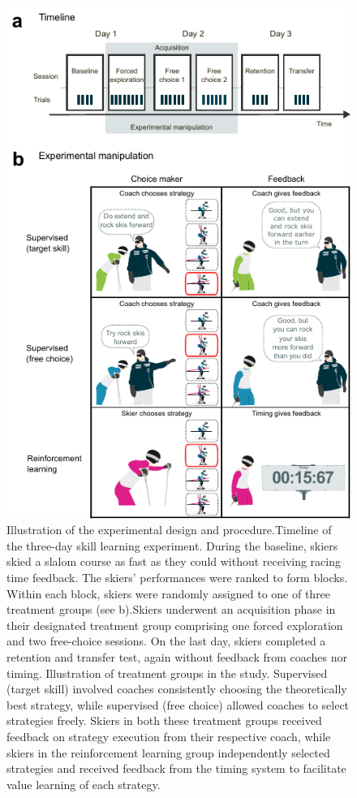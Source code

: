 \documentclass{article}
\begin{document}
\begin{figure}[h!]
\centering
\includegraphics{figures/figure_method_experiment.pdf}
\caption{Illustration of the experimental design and procedure.Timeline of the three-day skill learning experiment. During the baseline, skiers skied a slalom course as fast as they could without receiving racing time feedback. The skiers' performances were ranked to form blocks. Within each block, skiers were randomly assigned to one of three treatment groups (see b).Skiers underwent an acquisition phase in their designated treatment group comprising one forced exploration and two free-choice sessions. On the last day, skiers completed a retention and transfer test, again without feedback from coaches nor timing. Illustration of treatment groups in the study. Supervised (target skill) involved coaches consistently choosing the theoretically best strategy, while supervised (free choice) allowed coaches to select strategies freely. Skiers in both these treatment groups received feedback on strategy execution from their respective coach, while skiers in the reinforcement learning group independently selected strategies and received feedback from the timing system to facilitate value learning of each strategy. }
\label{fig:experiment}
\end{figure}
\end{document}
